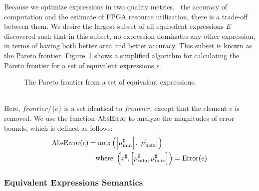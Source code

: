 Because we optimize expressions in two quality metrics, \ie~the accuracy of
computation and the estimate of FPGA resource utilization, there is a trade-off
between them. We desire the largest subset of all equivalent expressions
$E$ discovered such that in this subset, no expression dominates any other
expression, in terms of having both better area and better accuracy. This
subset is known as the Pareto frontier.  Figure~\ref{alg:pareto} shows
a simplified algorithm for calculating the Pareto frontier for a set of
equivalent expressions $\epsilon$.
\begin{figure}[ht]
    \centering
    \begin{algorithmic}
                    \EndIf{}
                \EndFor{}
            \EndFor{}
        \EndFunction%
    \end{algorithmic}
    \caption{The Pareto frontier from a set of equivalent expressions.
    }\label{alg:pareto}
\end{figure} \\
Here, $\mathit{frontier} / \{ e \}$ is a set identical to $\mathit{frontier}$,
except that the element $e$ is removed.  We use the function $\operatorname{\mathrm{AbsError}}$ to
analyze the magnitudes of error bounds, which is defined as follows:
\begin{equation}
    \begin{aligned}
        \operatorname{\mathrm{AbsError}}(e) &= \max\left(
            \left| \mu^\sharp_{\min} \right|,
            \left| \mu^\sharp_{\max} \right|
        \right) \\
        & \quad \text{where~}
        \left(
            x^\sharp, \left[ \mu^\sharp_{\min}, \mu^\sharp_{\max} \right]
        \right) = \operatorname{\mathrm{Error}}(e)
    \end{aligned}
\end{equation}

\subsubsection{Equivalent Expressions Semantics}

